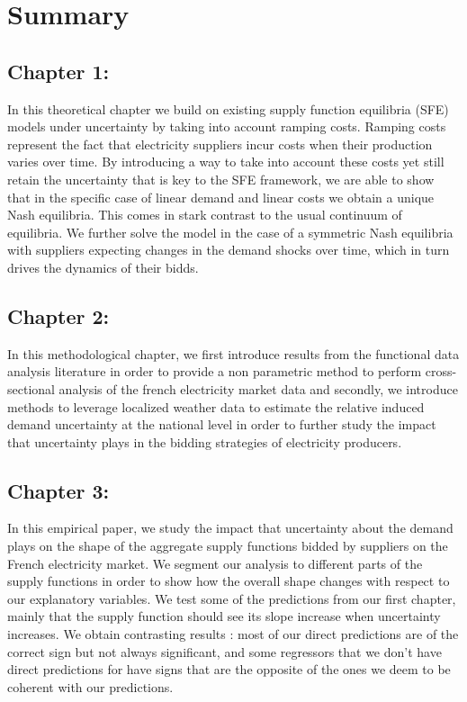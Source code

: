 \chapter*{Summary}
\cleardoublepage

\section*{Chapter 1: }

In this theoretical chapter we build on existing supply function equilibria (SFE) models under uncertainty by taking into account ramping costs. Ramping costs represent the fact that electricity suppliers incur costs when their production varies over time. By introducing a way to take into account these costs yet still retain the uncertainty that is key to the SFE framework, we are able to show that in the specific case of linear demand and linear costs we obtain a unique Nash equilibria. This comes in stark contrast to the usual continuum of equilibria. We further solve the model in the case of a symmetric Nash equilibria with suppliers expecting changes in the demand shocks over time, which in turn drives the dynamics of their bidds.

\section*{Chapter 2: }

In this methodological chapter, we first introduce results from the functional data analysis literature in order to provide a non parametric method to perform cross-sectional analysis of the french electricity market data and secondly, we introduce methods to leverage localized weather data to estimate the relative induced demand uncertainty at the national level in order to further study the impact that uncertainty plays in the bidding strategies of electricity producers.

\section*{Chapter 3: }
In this empirical paper, we study the impact that uncertainty about the demand plays on the shape of the aggregate supply functions bidded by suppliers on the French electricity market. We segment our analysis to different parts of the supply functions in order to show how the overall shape changes with respect to our explanatory variables. We test some of the predictions from our first chapter, mainly that the supply function should see its slope increase when uncertainty increases. We obtain contrasting results : most of our direct predictions are of the correct sign but not always significant, and some regressors that we don't have direct predictions for have signs that are the opposite of the ones we deem to be coherent with our predictions. 